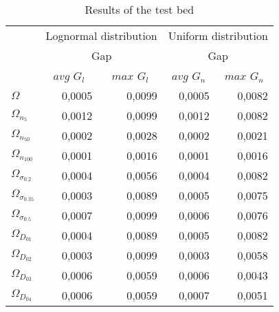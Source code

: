 \documentclass[preprint,12pt]{elsarticle}
\begin{document}
\begin{table}[htbp]
  \centering
  \caption{Results of the test bed }
    \begin{tabular}{lrrrr}
    \toprule
          & \multicolumn{2}{c}{Lognormal distribution} & \multicolumn{2}{c}{Uniform distribution} \\
          & \multicolumn{2}{c}{Gap} & \multicolumn{2}{c}{Gap} \\
          & \multicolumn{1}{c}{$avg$ $G_{l}$} & \multicolumn{1}{c}{$max$ $G_{l}$} & \multicolumn{1}{c}{$avg$ $G_{n}$} & \multicolumn{1}{c}{$max$ $G_{n}$} \\
    \midrule
     $\Omega$  & 0,0005 & 0,0099 & 0,0005 & 0,0082 \\
     $\Omega_{n_{5}}$ & 0,0012 & 0,0099 & 0,0012 & 0,0082 \\
    $\Omega_{n_{50}}$ & 0,0002 & 0,0028 & 0,0002 & 0,0021 \\
    $\Omega_{n_{100}}$ & 0,0001 & 0,0016 & 0,0001 & 0,0016 \\
    $\Omega_{\sigma_{0.2}}$ & 0,0004 & 0,0056 & 0,0004 & 0,0082 \\
    $\Omega_{\sigma_{0.35}}$ & 0,0003 & 0,0089 & 0,0005 & 0,0075 \\
   $\Omega_{\sigma_{0.5}}$ & 0,0007 & 0,0099 & 0,0006 & 0,0076 \\
   $\Omega_{D_{01}}$ & 0,0004 & 0,0089 & 0,0005 & 0,0082 \\
   $\Omega_{D_{02}}$ & 0,0003 & 0,0099 & 0,0003 & 0,0058 \\
   $\Omega_{D_{03}}$  & 0,0006 & 0,0059 & 0,0006 & 0,0043 \\
    $\Omega_{D_{04}}$  & 0,0006 & 0,0059 & 0,0007 & 0,0051 \\
    \bottomrule
    \end{tabular}%
  \label{generalapptable}%
\end{table}%
\end{document}
